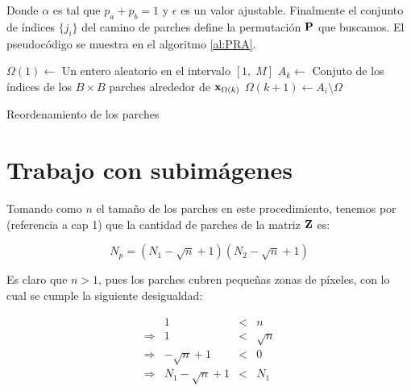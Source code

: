 Donde $\alpha$ es tal que $p_a + p_b = 1$ y $\epsilon$ es un valor ajustable. Finalmente el conjunto de \'indices $\{j_i\}$ del camino de parches define la permutaci\'on $\P$ que buscamos. El pseudoc\'odigo se muestra en el algoritmo \ref{al:PRA}.

\begin{algorithm}
	\DontPrintSemicolon %
	$\Omega(1) \gets$ Un entero aleatorio en el intervalo $[1,\; M]$\;
	 {
		$A_k \gets $ Conjuto de los \'indices de los $B \times B$ parches alrededor de $\x_{\Omega(k)}$\;
		 {
			$\Omega(k + 1) \gets A_i \setminus \Omega$\;
		}
	}
	\Return{$\Omega$}\;
	\caption{Reordenamiento de los parches}
	\label{al:PRA}
\end{algorithm}

\section{Trabajo con subim\'agenes}
Tomando como $n$ el tamaño de los parches en este procedimiento, tenemos por (referencia a cap 1) que la cantidad de parches de la matriz $\Z$ es: 

\begin{equation}
N_p = (N_1 - \sqrt{n} + 1)(N_2 - \sqrt{n} + 1)
\label{eq:patches}
\end{equation}

Es claro que $n > 1$, pues los parches cubren pequeñas zonas de p\'ixeles, con lo cual se cumple la siguiente desigualdad:

\begin{equation}
	\begin{array}{lrcl}
	                &                 1 &<& n        \\ 
	\Longrightarrow &                 1 &<& \sqrt{n} \\
	\Longrightarrow &     -\sqrt{n} + 1 &<& 0        \\
	\Longrightarrow & N_1 -\sqrt{n} + 1 &<& N_1      \\
	\end{array}
\end{equation}

